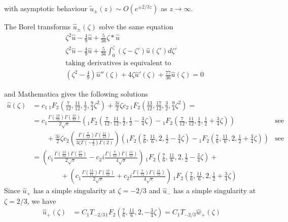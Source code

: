 \documentclass[11pt,a4paper,twoside,leqno,noamsfonts]{amsart}
\numberwithin{equation}{section}
\begin{document}
\begin{example}[Airy]
with asymptotic behaviour $\tilde{u}_\pm(z)\sim O(e^{\pm 2/3 z})$ as $z\to\infty$. 

The Borel transforms $\hat{u}_{\pm}(\zeta)$ solve the same equation
\begin{align*}
&\zeta^2\hat{u}-\frac{4}{9}\hat{u}+\frac{5}{36}\zeta\ast\hat{u}\\
&\zeta^2\hat{u}-\frac{4}{9}\hat{u}+\frac{5}{36}\int_0^\zeta(\zeta-\zeta')\hat{u}(\zeta')d\zeta'\\
&\text{taking derivatives is equivalent to} \\
&(\zeta^2-\frac{4}{9})\hat{u}''(\zeta)+4\zeta\hat{u}'(\zeta)+\frac{77}{36}\hat{u}(\zeta)=0
\end{align*}

and Mathematica gives the following solutions
\begin{align*}
\hat{u}(\zeta)&=c_1 \, {}_{1}F_{2}\left(\frac{7}{12},\frac{11}{12},\frac{1}{2},\frac{9}{4}\zeta^2\right) +\frac{3i}{2}\zeta c_2 \, {}_{1}F_{2}\left(\frac{13}{12},\frac{17}{12},\frac{3}{2},\frac{9}{4}\zeta^2\right)= &\\
&=c_1\frac{\Gamma(\frac{13}{12})\Gamma(\frac{17}{12})}{2\sqrt{\pi}}\left({}_{1}F_{2}\left(\frac{7}{12},\frac{11}{12},\frac{1}{2},\frac{1}{2}-\frac{3}{4}\zeta\right)- {}_{1}F_{2}\left(\frac{7}{12},\frac{11}{12},\frac{1}{2},\frac{1}{2}+\frac{3}{4}\zeta\right)\right) & \text{see DLMF 15.8.27} \\
&\qquad +\frac{3i}{2}\zeta c_2 \left(\frac{\Gamma(\frac{7}{12})\Gamma(\frac{11}{12})}{3\zeta\Gamma(-\frac{1}{2})\Gamma(2)}\right)\left( {}_{1}F_{2}\left(\frac{7}{6},\frac{11}{6},{2},\frac{1}{2}-\frac{3}{4}\zeta\right)-{}_{1}F_{2}\left(\frac{7}{6},\frac{11}{6},{2},\frac{1}{2}+\frac{3}{4}\zeta\right)\right)  & \text{see DLMF 15.8.28}\\
&=\left(c_1\frac{\Gamma(\frac{13}{12})\Gamma(\frac{17}{12})}{2\sqrt{\pi}} -c_2i\frac{\Gamma(\frac{7}{12})\Gamma(\frac{11}{12})}{4\sqrt{\pi}}\right)\, {}_{1}F_{2}\left(\frac{7}{6},\frac{11}{6},2,\frac{1}{2}-\frac{3}{4}\zeta\right)  + & \\
&\qquad\qquad +\left(c_1\frac{\Gamma(\frac{13}{12})\Gamma(\frac{17}{12})}{2\sqrt{\pi}} +c_2i\frac{\Gamma(\frac{7}{12})\Gamma(\frac{11}{12})}{4\sqrt{\pi}}\right)\, {}_{1}F_{2}\left(\frac{7}{6},\frac{11}{6},2,\frac{1}{2}+\frac{3}{4}\zeta\right) &  
\end{align*}
Since $\hat{u}_+$ has a simple singularity at $\zeta=-2/3$ and $\hat{u}_-$ has a simple singularity at $\zeta=2/3$, we have
\begin{align*}
\hat{u}_+(\zeta)&=C_1 T_{-2/3} {}_{1}F_{2}\left(\frac{7}{6},\frac{11}{6},2,-\frac{3}{4}\zeta\right)=C_1 T_{-2/3}\hat{w}_+(\zeta)\\

\end{align*}
\end{example}
\end{document}
